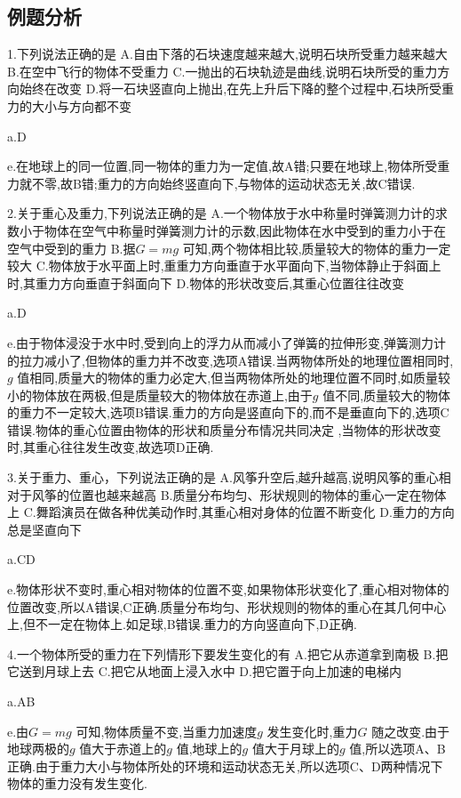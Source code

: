 \subsection{例题分析}
\begin{selection}
  1.下列说法正确的是
  A.自由下落的石块速度越来越大,说明石块所受重力越来越大
  B.在空中飞行的物体不受重力
  C.一抛出的石块轨迹是曲线,说明石块所受的重力方向始终在改变
  D.将一石块竖直向上抛出,在先上升后下降的整个过程中,石块所受重力的大小与方向都不变

  a.D

  e.在地球上的同一位置,同一物体的重力为一定值,故A错;只要在地球上,物体所受重力就不零,故B错;重力的方向始终竖直向下,与物体的运动状态无关,故C错误.

  2.关于重心及重力,下列说法正确的是
  A.一个物体放于水中称量时弹簧测力计的求数小于物体在空气中称量时弹簧测力计的示数,因此物体在水中受到的重力小于在空气中受到的重力
  B.据$G=mg$ 可知,两个物体相比较,质量较大的物体的重力一定较大
  C.物体放于水平面上时,重重力方向垂直于水平面向下,当物体静止于斜面上时,其重力方向垂直于斜面向下
  D.物体的形状改变后,其重心位置往往改变

  a.D

  e.由于物体浸没于水中时,受到向上的浮力从而减小了弹簧的拉伸形变,弹簧测力计的拉力减小了,但物体的重力并不改变,选项A错误.当两物体所处的地理位置相同时,$g$ 值相同,质量大的物体的重力必定大,但当两物体所处的地理位置不同时,如质量较小的物体放在两极,但是质量较大的物体放在赤道上,由于$g$ 值不同,质量较大的物体的重力不一定较大,选项B错误.重力的方向是竖直向下的,而不是垂直向下的,选项C错误.物体的重心位置由物体的形状和质量分布情况共同决定 ,当物体的形状改变时,其重心往往发生改变,故选项D正确.

  3.关于重力、重心，下列说法正确的是
  A.风筝升空后,越升越高,说明风筝的重心相对于风筝的位置也越来越高
  B.质量分布均匀、形状规则的物体的重心一定在物体上
  C.舞蹈演员在做各种优美动作时,其重心相对身体的位置不断变化
  D.重力的方向总是坚直向下

  a.CD

  e.物体形状不变时,重心相对物体的位置不变,如果物体形状变化了,重心相对物体的位置改变,所以A错误,C正确.质量分布均匀、形状规则的物体的重心在其几何中心上,但不一定在物体上.如足球,B错误.重力的方向竖直向下,D正确.

  4.一个物体所受的重力在下列情形下要发生变化的有
  A.把它从赤道拿到南极
  B.把它送到月球上去
  C.把它从地面上浸入水中
  D.把它置于向上加速的电梯内

  a.AB

  e.由$G=mg$ 可知,物体质量不变,当重力加速度$g$ 发生变化时,重力$G$ 随之改变.由于地球两极的$g$ 值大于赤道上的$g$ 值,地球上的$g$ 值大于月球上的$g$ 值,所以选项A、B正确.由于重力大小与物体所处的环境和运动状态无关,所以选项C、D两种情况下物体的重力没有发生变化.


\end{selection}
